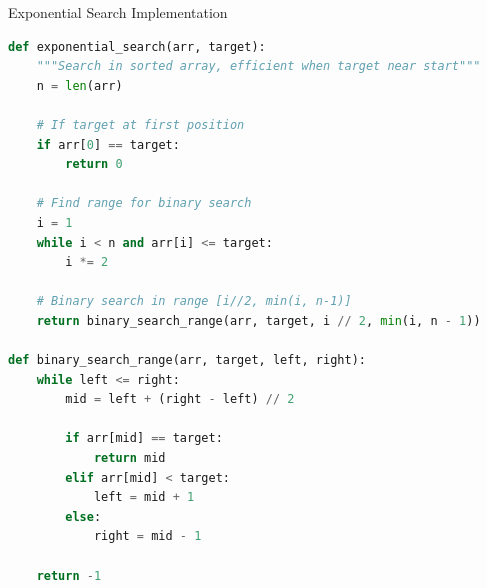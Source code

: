 \documentclass[aspectratio=169]{beamer}
\begin{document}
\begin{frame}[fragile]{Exponential Search Implementation}
\begin{lstlisting}[language=Python, basicstyle=\ttfamily\tiny]
def exponential_search(arr, target):
    """Search in sorted array, efficient when target near start"""
    n = len(arr)

    # If target at first position
    if arr[0] == target:
        return 0

    # Find range for binary search
    i = 1
    while i < n and arr[i] <= target:
        i *= 2

    # Binary search in range [i//2, min(i, n-1)]
    return binary_search_range(arr, target, i // 2, min(i, n - 1))

def binary_search_range(arr, target, left, right):
    while left <= right:
        mid = left + (right - left) // 2

        if arr[mid] == target:
            return mid
        elif arr[mid] < target:
            left = mid + 1
        else:
            right = mid - 1

    return -1
\end{lstlisting}
\end{frame}
\end{document}
